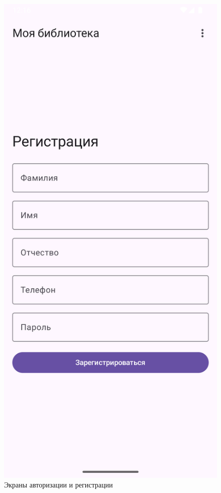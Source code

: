 \begin{figure}[H]
	\includegraphics[scale=0.125]{img/register.png}
	\caption{Экраны авторизации и регистрации}
\end{figure}

